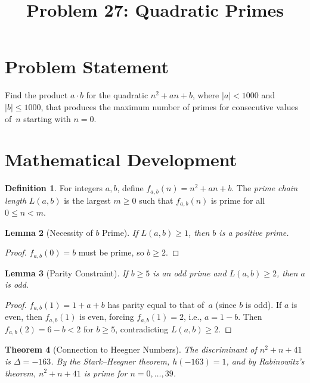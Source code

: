 \documentclass[12pt,a4paper]{article}
\title{Problem 27: Quadratic Primes}
\author{}
\date{}
\newtheorem{theorem}{Theorem}
\newtheorem{lemma}[theorem]{Lemma}
\theoremstyle{definition}
\newtheorem{definition}[theorem]{Definition}
\theoremstyle{remark}
\begin{document}
\maketitle

\section{Problem Statement}

Find the product $a \cdot b$ for the quadratic $n^2 + an + b$, where $|a| < 1000$ and $|b| \leq 1000$, that produces the maximum number of primes for consecutive values of~$n$ starting with $n = 0$.

\section{Mathematical Development}

\begin{definition}
For integers $a, b$, define $f_{a,b}(n) = n^2 + an + b$. The \emph{prime chain length} $L(a,b)$ is the largest $m \geq 0$ such that $f_{a,b}(n)$ is prime for all $0 \leq n < m$.
\end{definition}

\begin{lemma}[Necessity of $b$ Prime]\label{lem:bprime}
If $L(a,b) \geq 1$, then $b$ is a positive prime.
\end{lemma}

\begin{proof}
$f_{a,b}(0) = b$ must be prime, so $b \geq 2$.
\end{proof}

\begin{lemma}[Parity Constraint]\label{lem:parity}
If $b \geq 5$ is an odd prime and $L(a,b) \geq 2$, then $a$ is odd.
\end{lemma}

\begin{proof}
$f_{a,b}(1) = 1 + a + b$ has parity equal to that of~$a$ (since $b$ is odd). If $a$ is even, then $f_{a,b}(1)$ is even, forcing $f_{a,b}(1) = 2$, i.e., $a = 1 - b$. Then $f_{a,b}(2) = 6 - b < 2$ for $b \geq 5$, contradicting $L(a,b) \geq 2$.
\end{proof}

\begin{theorem}[Connection to Heegner Numbers]\label{thm:heegner}
The discriminant of $n^2 + n + 41$ is $\Delta = -163$. By the Stark--Heegner theorem, $h(-163) = 1$, and by Rabinowitz's theorem, $n^2 + n + 41$ is prime for $n = 0, \ldots, 39$.
\end{theorem}
\end{document}
